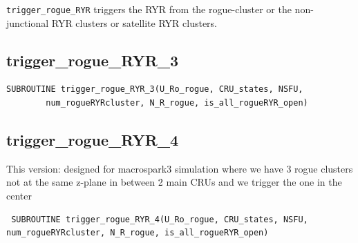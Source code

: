 \verb!trigger_rogue_RYR! triggers the RYR from the rogue-cluster or the
non-junctional RYR clusters or satellite RYR clusters.

\subsection{trigger\_rogue\_RYR\_3}
\label{sec:trigger_rogue_RYR_3}

\begin{verbatim}
SUBROUTINE trigger_rogue_RYR_3(U_Ro_rogue, CRU_states, NSFU, 
        num_rogueRYRcluster, N_R_rogue, is_all_rogueRYR_open)     
\end{verbatim}


\subsection{trigger\_rogue\_RYR\_4}
\label{sec:trigger_rogue_RYR_4}

This version: designed for macrospark3 simulation where we have 3 rogue clusters
not at the same z-plane in between 2 main CRUs and we trigger the one in the
center
\begin{verbatim}
 SUBROUTINE trigger_rogue_RYR_4(U_Ro_rogue, CRU_states, NSFU, 
num_rogueRYRcluster, N_R_rogue, is_all_rogueRYR_open)     
\end{verbatim}